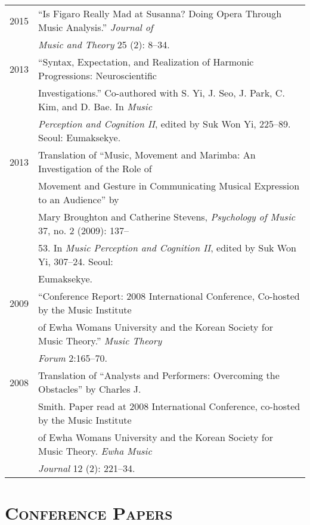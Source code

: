 \documentclass[letter,11pt,draft]{article}
\begin{document}
  \hspace*{-0.25cm}
  \begin{tabular}{p{2.5cm} p{12.5cm}}
    2015 & ``Is Figaro Really Mad at Susanna? Doing Opera Through Music Analysis.'' \textit{Journal of}\\
    & \textit{Music and Theory} 25 (2): 8--34.\\[2mm]
    
    2013 & “Syntax, Expectation, and Realization of Harmonic Progressions: Neuroscientific\\
    & Investigations.” Co-authored with S. Yi, J. Seo, J. Park, C. Kim, and D. Bae. In \textit{Music} \\
    & \textit{Perception and Cognition II}, edited by Suk Won Yi, 225–89. Seoul: Eumaksekye.\\[2mm]

    2013 & Translation of “Music, Movement and Marimba: An Investigation of the Role of\\
    & Movement and Gesture in Communicating Musical Expression to an Audience” by\\
    & Mary Broughton and Catherine Stevens, \textit{Psychology of Music} 37, no. 2 (2009): 137–\\
    & 53. In \textit{Music Perception and Cognition II}, edited by Suk Won Yi, 307–24. Seoul:\\
    & Eumaksekye.\\[2mm]
    
    2009 & “Conference Report: 2008 International Conference, Co-hosted by the Music Institute\\
    & of Ewha Womans University and the Korean Society for Music Theory.” \textit{Music Theory}\\
    & \textit{Forum} 2:165–70.\\[2mm]
    
    2008 & Translation of “Analysts and Performers: Overcoming the Obstacles” by Charles J.\\
    & Smith. Paper read at 2008 International Conference, co-hosted by the Music Institute\\
    & of Ewha Womans University and the Korean Society for Music Theory. \textit{Ewha Music}\\
    & \textit{Journal} 12 (2): 221–34.
  \end{tabular}
  
  \vspace{2.5mm}
  
  \section*{\textsc{Conference Papers}}
  
\end{document}
